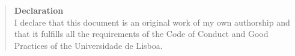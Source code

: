 \begin{quote}
\textbf{Declaration}\\
I declare that this document is an original work of my own authorship
and that it fulfills all the requirements of the Code of Conduct and
Good Practices of the Universidade de Lisboa.
\end{quote}
